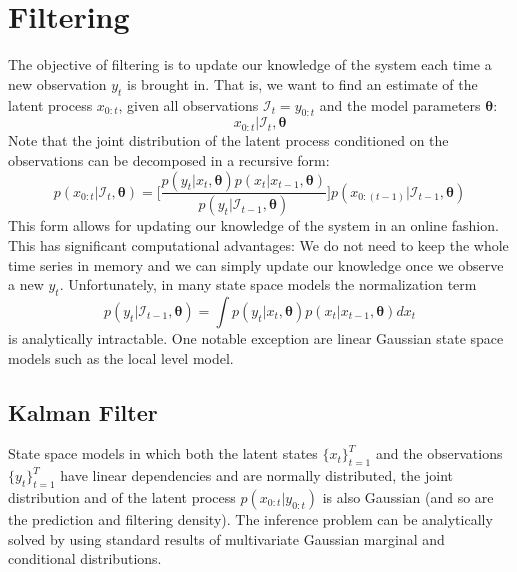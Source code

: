 \documentclass[11pt, oneside]{scrreprt}   	%
\begin{document}
\chapter{Filtering}
\label{chp:filtering}
The objective of filtering is to update our knowledge of the system each time a new observation $y_t$ is brought in. That is, we want to find an estimate of the latent process $x_{0:t}$, given all observations $\mathcal{I}_t = y_{0:t}$ and the model parameters $\boldsymbol{\theta}$:
$$
x_{0:t} | \mathcal{I}_t, \boldsymbol{\theta}
$$
Note that the joint distribution of the latent process conditioned on the observations can be decomposed in a recursive form:
$$
p(x_{0:t} | \mathcal{I}_t,\boldsymbol{\theta}) = \Big[ \frac{p(y_t | x_t,\boldsymbol{\theta}) p(x_t | x_{t-1},\boldsymbol{\theta})}{p(y_t | \mathcal{I}_{t-1},\boldsymbol{\theta})} \Big] p(x_{0:(t-1)} | \mathcal{I}_{t-1},\boldsymbol{\theta}) 
$$
This form allows for updating our knowledge of the system in an online fashion. This has significant computational advantages: We do not need to keep the whole time series in memory and we can simply update our knowledge once we observe a new $y_t$. Unfortunately, in many state space models the normalization term 
$$
p(y_t | \mathcal{I}_{t-1},\boldsymbol{\theta}) = \int p(y_t | x_t,\boldsymbol{\theta}) p(x_t | x_{t-1}, \boldsymbol{\theta}) d x_t
$$ 
is analytically intractable. One notable exception are linear Gaussian state space models such as the local level model.

\section{Kalman Filter}
State space models in which both the latent states $\{x_t\}_{t=1}^T$ and the observations $\{y_t\}_{t=1}^T$ have linear dependencies and are normally distributed, the joint distribution and of the latent process $p(x_{0:t} | y_{0:t})$ is also Gaussian (and so are the prediction and filtering density). 
The inference problem can be analytically solved by using standard results of multivariate Gaussian marginal and conditional distributions.\\
\end{document}
